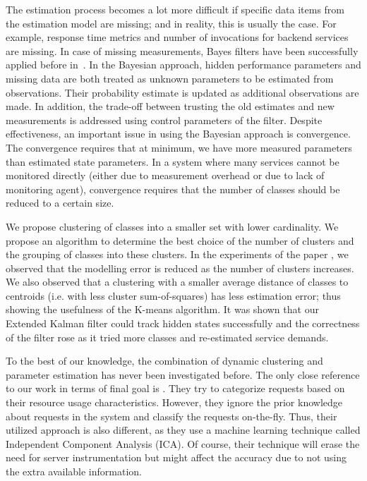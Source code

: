 \documentclass[11pt]{article}
\begin{document}
The estimation process becomes a lot more difficult if specific data items from the estimation model are missing; and in reality, this is usually the case.  
For example, response time metrics and number of invocations for backend services are missing. In case of missing measurements, Bayes filters have been successfully applied before in~\cite{woodside_use_2005,xu_performance_2005,zheng_tracking_2005}.  
In the Bayesian approach, hidden performance parameters and missing data are both treated as unknown parameters to be estimated from observations. Their probability estimate is updated as additional observations are made. 
In addition, the trade-off between trusting the old estimates and new measurements is addressed using control parameters of the filter. 
Despite effectiveness, an important issue in using the Bayesian approach is convergence. The convergence requires that at minimum, we have more measured parameters than estimated state parameters. 
In a system where many services cannot be monitored directly (either due to measurement overhead or due to lack of monitoring agent), convergence requires that the number of classes should be reduced to a certain size.

We propose clustering of classes into a smaller set with lower cardinality. We propose an algorithm to determine the best choice of the number of clusters and the grouping of classes into these clusters.
In the experiments of the paper \cite{hamoun_ghanbari_tuning}, we observed that the modelling error is reduced as the number of clusters increases. We also observed that a clustering with a smaller average distance of classes to centroids (i.e. with less cluster sum-of-squares) has less estimation error; thus showing the usefulness of the K-means algorithm. It was shown that our Extended Kalman filter could track hidden states successfully and the correctness of the filter rose as it tried more classes and re-estimated service demands.

  To the best of our knowledge, the combination of dynamic clustering and parameter estimation has never been investigated before. The only close reference to our work in terms of final goal is \cite{sharma_automatic_2008}. 
They try to categorize requests based on their resource usage characteristics. However, they ignore the prior knowledge about requests in the system and classify the requests on-the-fly. Thus, their utilized approach is also different, as they use a machine learning technique called Independent Component Analysis (ICA). Of course, their technique will erase the need for server instrumentation but might affect the accuracy due to not using the extra available information.
\end{document}
